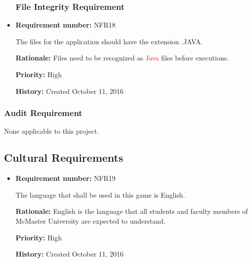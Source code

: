 \documentclass[12pt,letterpaper]{article}
\begin{document}
\begin{reqbox}
	\begin{itemize}

\subsubsection{File Integrity Requirement}

	\item \textbf{Requirement number: }NFR18  
	
	The files for the application should have the extension .JAVA.

	\textbf{Rationale: }Files need to be recognized as \textcolor{red}{Java} files before executions.
	
	\textbf{Priority: }High     
	 
	\textbf{History: }Created October 11, 2016  
	\end{itemize}
\end{reqbox}

\begin{reqbox}
	\begin{itemize}

\subsubsection{Audit Requirement}
None applicable to this project.

	\end{itemize}
\end{reqbox}

\subsection{Cultural Requirements}

\begin{reqbox}
	\begin{itemize}
	\item \textbf{Requirement number: }NFR19 
	
	The language that shall be used in this game is English.

	\textbf{Rationale: }English is the language that all students and faculty members of McMaster University are expected to understand.

	\textbf{Priority: }High
	
	\textbf{History: }Created October 11, 2016
	\end{itemize}
\end{reqbox}
\end{document}
